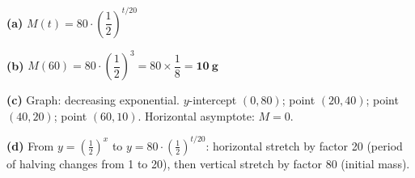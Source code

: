 \documentclass[addpoints]{exam}
\begin{document}
\begin{questions}
\begin{solution}[9cm]
\textbf{(a)} $M(t) = 80 \cdot \left(\dfrac{1}{2}\right)^{t/20}$

\textbf{(b)} $M(60) = 80 \cdot \left(\dfrac{1}{2}\right)^{3} = 80 \times \dfrac{1}{8}
= \mathbf{\SI{10}{g}}$

\textbf{(c)} Graph: decreasing exponential. $y$-intercept $(0, 80)$;
point $(20, 40)$; point $(40, 20)$; point $(60, 10)$.
Horizontal asymptote: $M = 0$.

\textbf{(d)} From $y = \left(\tfrac{1}{2}\right)^x$ to $y = 80\cdot\left(\tfrac{1}{2}\right)^{t/20}$:
horizontal stretch by factor 20 (period of halving changes from 1 to 20), then
vertical stretch by factor 80 (initial mass).
\end{solution}

\end{questions}
\end{document}
